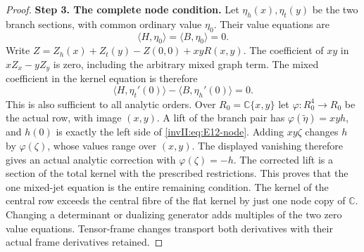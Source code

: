 \begin{proof}
\noindent\textbf{Step 3. The complete node condition.}
Let $\eta_h(x),\eta_t(y)$ be the two branch sections, with common
ordinary value $\eta_0$. Their value equations are
\[
 \langle H,\eta_0\rangle=\langle B,\eta_0\rangle=0.
\]
Write $Z=Z_h(x)+Z_t(y)-Z(0,0)+xyR(x,y)$. The coefficient of $xy$
in $xZ_x-yZ_y$ is zero, including the arbitrary mixed graph term.
The mixed coefficient in the kernel equation is therefore
\[
 \langle H,\eta_t'(0)\rangle
       -\langle B,\eta_h'(0)\rangle=0.                 \tag{E.12.1}\label{invII:eq:E12-node}
\]
This is also sufficient to all analytic orders. Over
$R_0=\mathbb C\{x,y\}$ let $\varphi:R_0^4\to R_0$ be the actual
row, with image $(x,y)$. A lift of the branch pair has
$\varphi(\widetilde\eta)=xyh$, and $h(0)$ is exactly the left side
of \eqref{invII:eq:E12-node}. Adding $xy\zeta$ changes $h$ by
$\varphi(\zeta)$, whose values range over $(x,y)$. The displayed
vanishing therefore gives an actual analytic correction with
$\varphi(\zeta)=-h$. The corrected lift is a section of the
total kernel with the prescribed restrictions. This proves that
the one mixed-jet equation is the entire remaining condition.
The kernel of the central row exceeds the central fibre of the
flat kernel by just one node copy of $\mathbb C$.
Changing a determinant or dualizing generator adds multiples of
the two zero value equations. Tensor-frame changes transport both
derivatives with their actual frame derivatives retained.


\end{proof}

